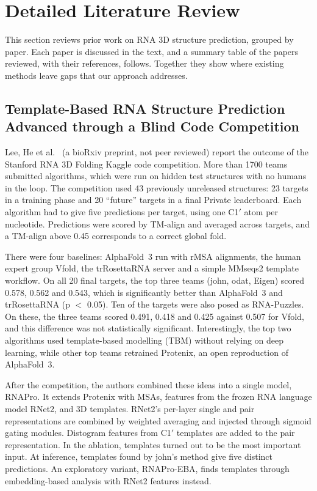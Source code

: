 \documentclass{FastFyp}
\begin{document}
\section{Detailed Literature Review}\label{sec:detailedlit}
This section reviews prior work on RNA 3D structure prediction, grouped by paper. Each paper is discussed in the text, and a summary table of the papers reviewed, with their references, follows. Together they show where existing methods leave gaps that our approach addresses.

\subsection{Template-Based RNA Structure Prediction Advanced through a Blind Code Competition}
Lee, He et al.\ \cite{leerna} (a bioRxiv preprint, not peer reviewed) report the outcome of the Stanford RNA 3D Folding Kaggle code competition. More than 1700 teams submitted algorithms, which were run on hidden test structures with no humans in the loop. The competition used 43 previously unreleased structures: 23 targets in a training phase and 20 ``future'' targets in a final Private leaderboard. Each algorithm had to give five predictions per target, using one C1$'$ atom per nucleotide. Predictions were scored by TM-align and averaged across targets, and a TM-align above 0.45 corresponds to a correct global fold.

There were four baselines: AlphaFold~3 run with rMSA alignments, the human expert group Vfold, the trRosettaRNA server and a simple MMseqs2 template workflow. On all 20 final targets, the top three teams (john, odat, Eigen) scored 0.578, 0.562 and 0.543, which is significantly better than AlphaFold~3 and trRosettaRNA (p $<$ 0.05). Ten of the targets were also posed as RNA-Puzzles. On these, the three teams scored 0.491, 0.418 and 0.425 against 0.507 for Vfold, and this difference was not statistically significant. Interestingly, the top two algorithms used template-based modelling (TBM) without relying on deep learning, while other top teams retrained Protenix, an open reproduction of AlphaFold~3.

After the competition, the authors combined these ideas into a single model, RNAPro. It extends Protenix with MSAs, features from the frozen RNA language model RNet2, and 3D templates. RNet2's per-layer single and pair representations are combined by weighted averaging and injected through sigmoid gating modules. Distogram features from C1$'$ templates are added to the pair representation. In the ablation, templates turned out to be the most important input. At inference, templates found by john's method give five distinct predictions. An exploratory variant, RNAPro-EBA, finds templates through embedding-based analysis with RNet2 features instead.
\end{document}
